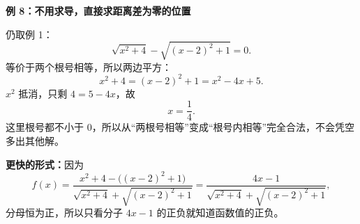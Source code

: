 \clearpage
\begin{examplebox}
	\textbf{\textcolor{CExample}{例 8：不用求导，直接求距离差为零的位置}}



	仍取例 1：
	\[
		\sqrt{x^2+4}-\sqrt{(x-2)^2+1}=0.
	\]
	等价于两个根号相等，所以两边平方：
	\[
		x^2+4=(x-2)^2+1=x^2-4x+5.
	\]
	$x^2$ 抵消，只剩 $4=5-4x$，故
	\[
		\boxed{x=\frac14}.
	\]
	这里根号都不小于 $0$，所以从“两根号相等”变成“根号内相等”完全合法，不会凭空多出其他解。

	\textbf{更快的形式：}因为
	\[
		f(x)=\frac{x^2+4-\bigl((x-2)^2+1\bigr)}{
			\sqrt{x^2+4}+\sqrt{(x-2)^2+1}}
		=\frac{4x-1}{\sqrt{x^2+4}+\sqrt{(x-2)^2+1}},
	\]
	分母恒为正，所以只看分子 $4x-1$ 的正负就知道函数值的正负。
\end{examplebox}
